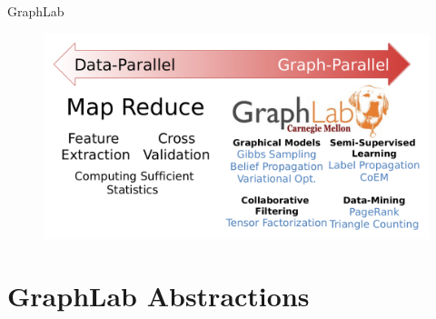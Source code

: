 \documentclass[onlymath,xcolor=pdftex,dvipsnames,table]{beamer}
\theoremstyle{remark} %
\begin{document}
\begin{frame}{GraphLab}
\begin{figure}
  \includegraphics[width=\textwidth]{overview.pdf}
\end{figure}
\end{frame}

\section{GraphLab Abstractions}
\end{document}
